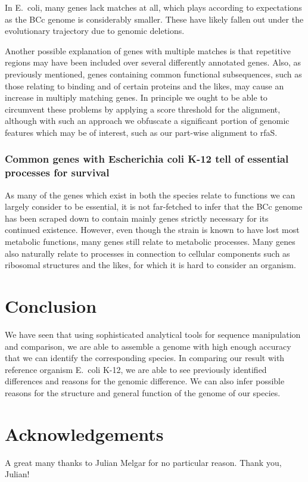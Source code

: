 \documentclass[10pt]{article}\usepackage[]{graphicx}\usepackage[]{color}
\theoremstyle{plain}
\theoremstyle{definition}
\begin{document}
\begin{multicols}{2}
In E.\ coli, many genes lack matches at all, which plays according to expectations as the BCc genome is considerably smaller. These have likely fallen out under the evolutionary trajectory due to genomic deletions. 

Another possible explanation of genes with multiple matches is that repetitive regions may have been included over several differently annotated genes. Also, as previously mentioned, genes containing common functional subsequences, such as those relating to binding and of certain proteins and the likes, may cause an increase in multiply matching genes. In principle we ought to be able to circumvent these problems by applying a score threshold for the alignment, although with such an approach we obfuscate a significant portion of genomic features which may be of interest, such as our part-wise alignment to rfaS. 

\subsubsection*{Common genes with Escherichia coli K-12 tell of essential processes for survival}
As many of the genes which exist in both the species relate to functions we can largely consider to be essential, it is not far-fetched to infer that the BCc genome has been scraped down to contain mainly genes strictly necessary for its continued existence. However, even though the strain is known to have lost most metabolic functions, many genes still relate to metabolic processes. Many genes also naturally relate to processes in connection to cellular components such as ribosomal structures and the likes, for which it is hard to consider an organism. 

\section{Conclusion}
We have seen that using sophisticated analytical tools for sequence manipulation and comparison, we are able to assemble a genome with high enough accuracy that we can identify the corresponding species. In comparing our result with reference organism E.\ coli K-12, we are able to see previously identified differences and reasons for the genomic difference. We can also infer possible reasons for the structure and general function of the genome of our species.

\section*{Acknowledgements}
A great many thanks to Julian Melgar for no particular reason. Thank you, Julian!


\printbibliography
\end{multicols}
\appendix
\end{document}
